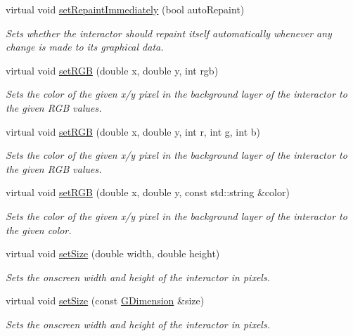\begin{DoxyCompactItemize}
virtual void \mbox{\hyperlink{classGDrawingSurface_abf5590a3992dcb7896ed449e65961da3}{set\+Repaint\+Immediately}} (bool auto\+Repaint)
\begin{DoxyCompactList}\small\item\em Sets whether the interactor should repaint itself automatically whenever any change is made to its graphical data. \end{DoxyCompactList}\item 
virtual void \mbox{\hyperlink{classGDrawingSurface_a8bcbd65fa784bdab1e66a9efd381162d}{set\+R\+GB}} (double x, double y, int rgb)
\begin{DoxyCompactList}\small\item\em Sets the color of the given x/y pixel in the background layer of the interactor to the given R\+GB values. \end{DoxyCompactList}\item 
virtual void \mbox{\hyperlink{classGDrawingSurface_a81202471d4fc9f2015aef0bc073acfab}{set\+R\+GB}} (double x, double y, int r, int g, int b)
\begin{DoxyCompactList}\small\item\em Sets the color of the given x/y pixel in the background layer of the interactor to the given R\+GB values. \end{DoxyCompactList}\item 
virtual void \mbox{\hyperlink{classGDrawingSurface_ae9a228792d4bb4b628350f39eaa3ad12}{set\+R\+GB}} (double x, double y, const std\+::string \&color)
\begin{DoxyCompactList}\small\item\em Sets the color of the given x/y pixel in the background layer of the interactor to the given color. \end{DoxyCompactList}\item 
virtual void \mbox{\hyperlink{classGInteractor_aca25d49481f9bf5fc8f7df4c086c4ce7}{set\+Size}} (double width, double height)
\begin{DoxyCompactList}\small\item\em Sets the onscreen width and height of the interactor in pixels. \end{DoxyCompactList}\item 
virtual void \mbox{\hyperlink{classGInteractor_ae2b628228f192c2702c4ce941b2af68f}{set\+Size}} (const \mbox{\hyperlink{classGDimension}{G\+Dimension}} \&size)
\begin{DoxyCompactList}\small\item\em Sets the onscreen width and height of the interactor in pixels. \end{DoxyCompactList}\item 

\end{DoxyCompactItemize}
